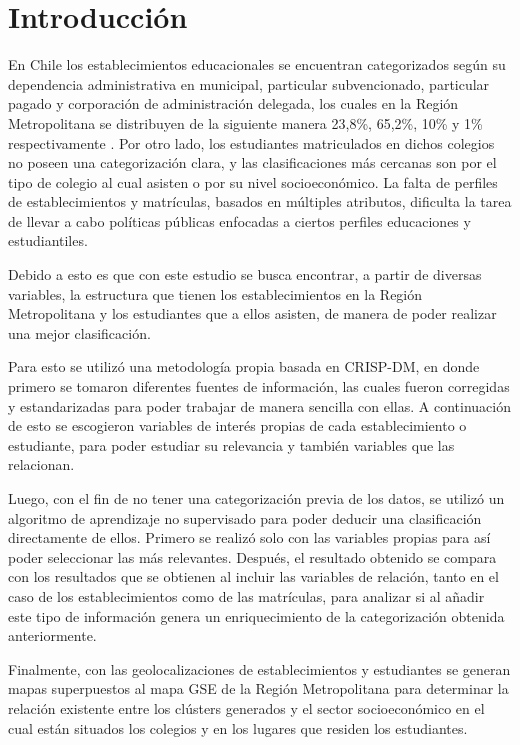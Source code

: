 \chapter*{Introducci\'on}

En Chile los establecimientos educacionales se encuentran categorizados según su dependencia administrativa en municipal, particular subvencionado, particular pagado y corporación de administración delegada, los cuales en la Región Metropolitana se distribuyen de la siguiente manera 23,8\%, 65,2\%, 10\% y 1\% respectivamente \cite{estadisticasEducacion}. Por otro lado, los estudiantes matriculados en dichos colegios no poseen una categorización clara, y las clasificaciones más cercanas son por el tipo de colegio al cual asisten o por su nivel socioeconómico. La falta de perfiles de establecimientos y matrículas, basados en múltiples atributos, dificulta la tarea de llevar a cabo políticas públicas enfocadas a ciertos perfiles educaciones y estudiantiles.

Debido a esto es que con este estudio se busca encontrar, a partir de diversas variables, la estructura que tienen los establecimientos en la Región Metropolitana y los estudiantes que a ellos asisten, de manera de poder realizar una mejor clasificación. 

Para esto se utilizó una metodología propia basada en CRISP-DM, en donde primero se tomaron diferentes fuentes de información, las cuales fueron corregidas y estandarizadas para poder trabajar de manera sencilla con ellas. A continuación de esto se escogieron variables de interés propias de cada establecimiento o estudiante, para poder estudiar su relevancia y también variables que las relacionan.

Luego, con el fin de no tener una categorización previa de los datos, se utilizó un algoritmo de aprendizaje no supervisado para poder deducir una clasificación directamente de ellos. Primero se realizó solo con las variables propias para así poder seleccionar las más relevantes. Después, el resultado obtenido se compara con los resultados que se obtienen al incluir las variables de relación, tanto en el caso de los establecimientos como de las matrículas, para analizar si al añadir este tipo de información genera un enriquecimiento de la categorización obtenida anteriormente.

Finalmente, con las geolocalizaciones de establecimientos y estudiantes se generan mapas superpuestos al mapa GSE de la Región Metropolitana para determinar la relación existente entre los clústers generados y el sector socioeconómico en el cual están situados los colegios y en los lugares que residen los estudiantes.

